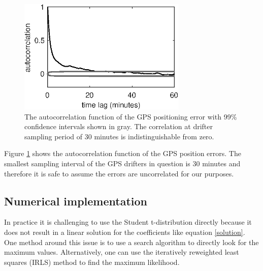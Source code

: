 \documentclass[10pt,journal]{IEEEtran}
\begin{document}
\begin{figure}
  \centerline{\includegraphics[width=19pc,angle=0]{figures/gps_autocorrelation}}
  \caption{The autocorrelation function of the GPS positioning error with 99\% confidence intervals shown in gray. The correlation at drifter sampling period of 30 minutes is indistinguishable from zero.}
  \label{gps_autocorrelation}
\end{figure}

Figure \ref{gps_autocorrelation} shows the autocorrelation function of the GPS position errors. The smallest sampling interval of the GPS drifters in question is 30 minutes and therefore it is safe to assume the errors are uncorrelated for our purposes.

%
\subsection{Numerical implementation}
%

In practice it is challenging to use the Student t-distribution directly because it does not result in a linear solution for the coefficients like equation \ref{solution}. One method around this issue is to use a search algorithm to directly look for the maximum values. Alternatively, one can use the iteratively reweighted least squares (IRLS) method to find the maximum likelihood.
\end{document}
